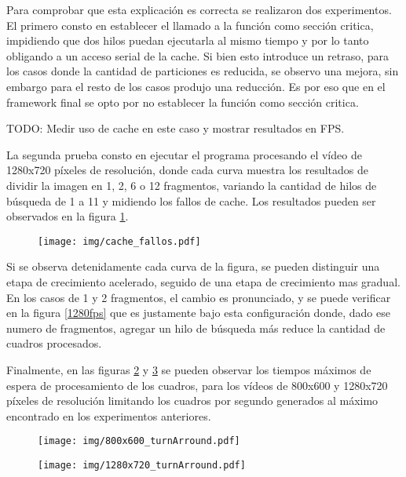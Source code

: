 Para comprobar que esta explicación es correcta se realizaron dos experimentos.
El primero consto en establecer el llamado a la función como sección critica,
impidiendo que dos hilos puedan ejecutarla al mismo tiempo y por lo tanto
obligando a un acceso serial de la cache. Si bien esto introduce un retraso,
para los casos donde la cantidad de particiones es reducida, se observo una
mejora, sin embargo para el resto de los casos produjo una reducción. Es por eso
que en el framework final se opto por no establecer la función como sección
critica.

TODO: Medir uso de cache en este caso y mostrar resultados en FPS.

La segunda prueba consto en ejecutar el programa procesando el vídeo de 1280x720
píxeles de resolución, donde cada curva muestra los resultados de dividir la
imagen en 1, 2, 6 o 12 fragmentos, variando la cantidad de hilos de búsqueda de
1 a 11 y midiendo los fallos de cache. Los resultados pueden ser observados en
la figura \ref{cacheFallos}.

\begin{figure}[!h]

	\texttt{[image: img/cache\_fallos.pdf]}
	\caption{}
	\label{cacheFallos}

\end{figure}

Si se observa detenidamente cada curva de la figura, se pueden distinguir una
etapa de crecimiento acelerado, seguido de una etapa de crecimiento mas gradual.
En los casos de 1 y 2 fragmentos, el cambio es pronunciado, y se puede verificar
en la figura \ref{1280fps} que es justamente bajo esta configuración donde, dado
ese numero de fragmentos, agregar un hilo de búsqueda más reduce la cantidad de
cuadros procesados.

Finalmente, en las figuras \ref{800turnArround} y \ref{1280turnArround} se
pueden observar los tiempos máximos de espera de procesamiento de los cuadros,
para los vídeos de 800x600 y 1280x720 píxeles de resolución limitando los
cuadros por segundo generados al máximo encontrado en los experimentos
anteriores.

\begin{figure}[!h]

	\texttt{[image: img/800x600\_turnArround.pdf]}
	\caption{}
	\label{800turnArround}

\end{figure}


\begin{figure}[!h]

	\texttt{[image: img/1280x720\_turnArround.pdf]}
	\caption{}
	\label{1280turnArround}

\end{figure}

